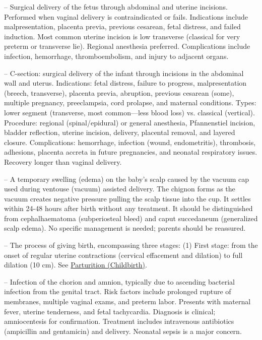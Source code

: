 -- Surgical delivery of the fetus through abdominal and uterine incisions. Performed when vaginal delivery is contraindicated or fails. Indications include malpresentation, placenta previa, previous cesarean, fetal distress, and failed induction. Most common uterine incision is low transverse (classical for very preterm or transverse lie). Regional anesthesia preferred. Complications include infection, hemorrhage, thromboembolism, and injury to adjacent organs.

-- C-section: surgical delivery of the infant through incisions in the abdominal wall and uterus. Indications: fetal distress, failure to progress, malpresentation (breech, transverse), placenta previa, abruption, previous cesarean (some), multiple pregnancy, preeclampsia, cord prolapse, and maternal conditions. Types: lower segment (transverse, most common—less blood loss) vs. classical (vertical). Procedure: regional (spinal/epidural) or general anesthesia, Pfannenstiel incision, bladder reflection, uterine incision, delivery, placental removal, and layered closure. Complications: hemorrhage, infection (wound, endometritis), thrombosis, adhesions, placenta accreta in future pregnancies, and neonatal respiratory issues. Recovery longer than vaginal delivery.

-- A temporary swelling (edema) on the baby's scalp caused by the vacuum cap used during ventouse (vacuum) assisted delivery. The chignon forms as the vacuum creates negative pressure pulling the scalp tissue into the cup. It settles within 24-48 hours after birth without any treatment. It should be distinguished from cephalhaematoma (subperiosteal bleed) and caput succedaneum (generalized scalp edema). No specific management is needed; parents should be reassured.

-- The process of giving birth, encompassing three stages: (1) First stage: from the onset of regular uterine contractions (cervical effacement and dilation) to full dilation (10 cm). See \hyperlink{Parturition (Childbirth)}{Parturition (Childbirth)}.

-- Infection of the chorion and amnion, typically due to ascending bacterial infection from the genital tract. Risk factors include prolonged rupture of membranes, multiple vaginal exams, and preterm labor. Presents with maternal fever, uterine tenderness, and fetal tachycardia. Diagnosis is clinical; amniocentesis for confirmation. Treatment includes intravenous antibiotics (ampicillin and gentamicin) and delivery. Neonatal sepsis is a major concern.

